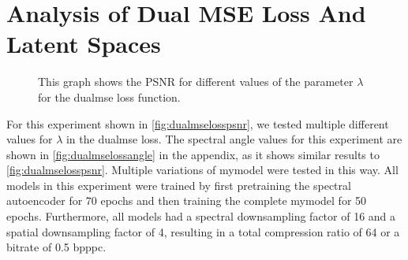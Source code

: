 \section{Analysis of Dual MSE Loss And Latent Spaces \label{sec:ch5dualmse}}
\begin{figure}
	\centering
	\datatable
	\caption{This graph shows the PSNR for different values of the parameter $\lambda$ for the \ac{dualmse} loss function.}
	\label{fig:dualmselosspsnr}
	\end{figure}
For this experiment shown in \autoref{fig:dualmselosspsnr}, we tested multiple different values for $\lambda$ in the \ac{dualmse} loss. The spectral angle values for this experiment are shown in \autoref{fig:dualmselossangle} in the appendix, as it shows similar results to \autoref{fig:dualmselosspsnr}. Multiple variations of \ac{mymodel} were tested in this way. All models in this experiment were trained by first pretraining the spectral autoencoder for 70 epochs and then training the complete \ac{mymodel} for 50 epochs. Furthermore, all models had a spectral downsampling factor of 16 and a spatial downsampling factor of 4, resulting in a total compression ratio of 64 or a bitrate of 0.5 \ac{bpppc}.

